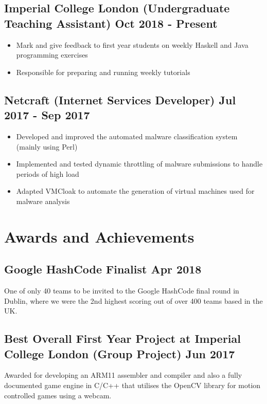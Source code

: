\documentclass[a4paper]{article}
\begin{document}
\subsection*{Imperial College London \textnormal{(Undergraduate Teaching Assistant)} \hfill Oct 2018 - Present}

\begin{itemize}
    \item Mark and give feedback to first year students on weekly Haskell and Java programming exercises
    \item Responsible for preparing and running weekly tutorials
\end{itemize}

\subsection*{Netcraft \textnormal{(Internet Services Developer)} \hfill Jul 2017 - Sep 2017}

\begin{itemize}
    \item Developed and improved the automated malware classification system (mainly using Perl)
    \item Implemented and tested dynamic throttling of malware submissions to handle periods of high load
    \item Adapted VMCloak to automate the generation of virtual machines used for malware analysis
\end{itemize}

\section*{Awards and Achievements}

\subsection*{Google HashCode Finalist \hfill Apr 2018}

One of only 40 teams to be invited to the Google HashCode final round in Dublin, where we were the 2nd highest scoring out of over 400 teams based in the UK.

\subsection*{Best Overall First Year Project at Imperial College London \textnormal{(Group Project)} \hfill Jun 2017}

Awarded for developing an ARM11 assembler and compiler and also a fully documented game engine in C/C++ that utilises the OpenCV library for motion controlled games using a webcam.
\end{document}
